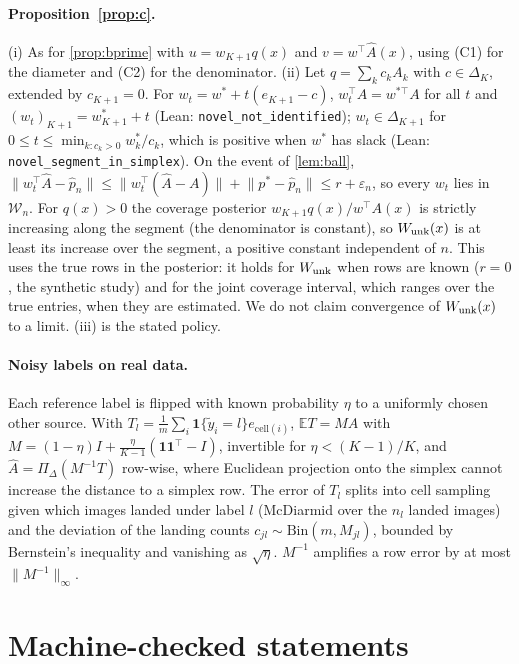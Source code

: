 \paragraph{Proposition~\ref{prop:c}.} (i) As for \cref{prop:bprime} with $u=w_{K+1}q(x)$ and
$v=w^{\top}\hat A(x)$, using (C1) for the diameter and (C2) for the denominator. (ii) Let
$q=\sum_kc_kA_k$ with $c\in\Delta_K$, extended by $c_{K+1}=0$. For $w_t=w^{*}+t(e_{K+1}-c)$,
$w_t^{\top}A=w^{*\top}A$ for all $t$ and $(w_t)_{K+1}=w^{*}_{K+1}+t$ (Lean:
\texttt{novel\_not\_identified}); $w_t\in\Delta_{K+1}$ for $0\le t\le\min_{k:c_k>0}w^{*}_k/c_k$,
which is positive when $w^{*}$ has slack (Lean: \texttt{novel\_segment\_in\_simplex}). On the event of
\cref{lem:ball}, $\lVert w_t^{\top}\hat A-\hat p_n\rVert\le\lVert w_t^{\top}(\hat A-A)\rVert+\lVert p^{*}-\hat p_n\rVert
\le r+\varepsilon_n$, so every $w_t$ lies in $\mathcal W_n$. For $q(x)>0$ the coverage posterior
$w_{K+1}q(x)/w^{\top}A(x)$ is strictly increasing along the segment (the denominator is constant), so
$W_{\mathrm{unk}}(x)$ is at least its increase over the segment, a positive constant independent of $n$. This
uses the true rows in the posterior: it holds for $W_{\mathrm{unk}}$ when rows are known ($r=0$, the synthetic
study) and for the joint coverage interval, which ranges over the true entries, when they are
estimated. We do not claim convergence of $W_{\mathrm{unk}}(x)$ to a limit. (iii) is the stated policy.

\paragraph{Noisy labels on real data.} Each reference label is flipped with known probability $\eta$
to a uniformly chosen other source. With $T_l=\frac1m\sum_i\mathbf 1\{\tilde y_i=l\}e_{\mathrm{cell}(i)}$,
$\mathbb ET=MA$ with $M=(1-\eta)I+\frac{\eta}{K-1}(\mathbf 1\mathbf 1^{\top}-I)$, invertible for
$\eta<(K-1)/K$, and $\hat A=\Pi_\Delta(M^{-1}T)$ row-wise, where Euclidean projection onto the
simplex cannot increase the distance to a simplex row. The error of $T_l$ splits into cell sampling
given which images landed under label $l$ (McDiarmid over the $n_l$ landed images) and the deviation
of the landing counts $c_{jl}\sim\mathrm{Bin}(m,M_{jl})$, bounded by Bernstein's inequality and
vanishing as $\sqrt\eta$. $M^{-1}$ amplifies a row error by at most $\lVert M^{-1}\rVert_\infty$.

\section{Machine-checked statements}
\label{app:lean}

